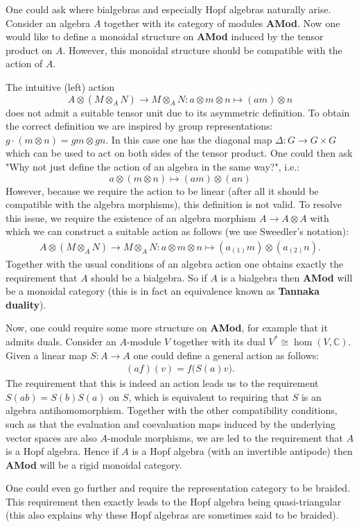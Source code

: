     \begin{remark}
        One could ask where bialgebras and especially Hopf algebras naturally arise. Consider an algebra $A$ together with its category of modules \textbf{AMod}. Now one would like to define a monoidal structure on \textbf{AMod} induced by the tensor product on $A$. However, this monoidal structure should be compatible with the action of $A$.

        The intuitive (left) action \[A\otimes(M\otimes_A N)\rightarrow M\otimes_AN: a\otimes m\otimes n\mapsto (am)\otimes n\] does not admit a suitable tensor unit due to its asymmetric definition. To obtain the correct definition we are inspired by group representations: $g\cdot(m\otimes n) = gm\otimes gn$. In this case one has the diagonal map $\Delta:G\rightarrow G\times G$ which can be used to act on both sides of the tensor product. One could then ask "Why not just define the action of an algebra in the same way?", i.e.: \[a\otimes (m\otimes n)\mapsto (am)\otimes(an)\] However, because we require the action to be linear (after all it should be compatible with the algebra morphisms), this definition is not valid. To resolve this issue, we require the existence of an algebra morphism $A\rightarrow A\otimes A$ with which we can construct a suitable action as follows (we use Sweedler's notation):
        \begin{gather}
            A\otimes(M\otimes_AN)\rightarrow M\otimes_AN:a\otimes m\otimes n\mapsto (a_{(1)}m)\otimes(a_{(2)}n).
        \end{gather}
        Together with the usual conditions of an algebra action one obtains exactly the requirement that $A$ should be a bialgebra. So if $A$ is a bialgebra then \textbf{AMod} will be a monoidal category (this is in fact an equivalence known as \textbf{Tannaka duality}).

        Now, one could require some more structure on \textbf{AMod}, for example that it admits duals. Consider an $A$-module $V$ together with its dual $V^*\cong\hom(V, \mathbb{C})$. Given a linear map $S:A\rightarrow A$ one could define a general action as follows:
        \begin{gather}
            (af)(v) = f\big(S(a)v\big).
        \end{gather}
        The requirement that this is indeed an action leads us to the requirement $S(ab) = S(b)S(a)$ on $S$, which is equivalent to requiring that $S$ is an algebra antihomomorphism. Together with the other compatibility conditions, such as that the evaluation and coevaluation maps induced by the underlying vector spaces are also $A$-module morphisms, we are led to the requirement that $A$ is a Hopf algebra. Hence if $A$ is a Hopf algebra (with an invertible antipode) then \textbf{AMod} will be a rigid monoidal category.

        One could even go further and require the representation category to be braided. This requirement then exactly leads to the Hopf algebra being quasi-triangular (this also explains why these Hopf algebras are sometimes said to be braided).
    \end{remark}

